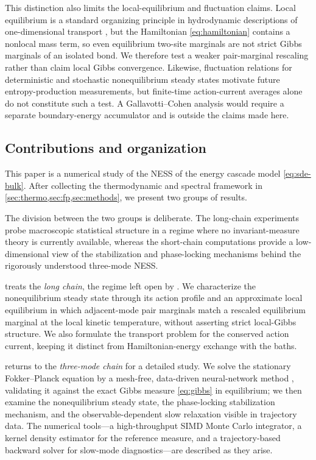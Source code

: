 \documentclass[11pt,a4paper]{article}
\theoremstyle{definition}
\numberwithin{equation}{section}   %
\begin{document}
This distinction also limits the local-equilibrium and fluctuation claims.
Local equilibrium is a standard organizing principle in hydrodynamic
descriptions of one-dimensional transport \cite{Spohn2014}, but the Hamiltonian
\eqref{eq:hamiltonian} contains a nonlocal mass term, so even equilibrium
two-site marginals are not strict Gibbs marginals of an isolated bond. We
therefore test a weaker pair-marginal rescaling rather than claim local Gibbs
convergence. Likewise, fluctuation relations for deterministic and stochastic
nonequilibrium steady states \cite{GallavottiCohen,LebowitzSpohn1999} motivate
future entropy-production measurements, but finite-time action-current averages
alone do not constitute such a test. A Gallavotti--Cohen analysis would require
a separate boundary-energy accumulator and is outside the claims made here.

\subsection{Contributions and organization}\label{sec:contributions}

This paper is a numerical study of the NESS of the energy cascade model
\eqref{eq:sde-bulk}. After collecting the thermodynamic and spectral framework in
\cref{sec:thermo,sec:fp,sec:methods}, we present two groups of results.

The division between the two groups is deliberate. The long-chain experiments
probe macroscopic statistical structure in a regime where no invariant-measure
theory is currently available, whereas the short-chain computations provide a
low-dimensional view of the stabilization and phase-locking mechanisms behind
the rigorously understood three-mode NESS.

 treats the \emph{long chain}, the regime left open by
\cite{HLNS}. We characterize the nonequilibrium steady state through its action
profile and an approximate local equilibrium in which adjacent-mode pair
marginals match a rescaled equilibrium marginal at the local kinetic
temperature, without asserting strict local-Gibbs structure. We also formulate
the transport problem for the conserved action current, keeping it distinct
from Hamiltonian-energy exchange with the baths.

 returns to the \emph{three-mode chain} for a detailed
study. We solve the stationary Fokker--Planck equation by a mesh-free,
data-driven neural-network method \cite{ZhaiDobsonLi}, validating it against the
exact Gibbs measure \eqref{eq:gibbs} in equilibrium; we then examine the
nonequilibrium steady state, the phase-locking stabilization mechanism, and the
observable-dependent slow relaxation visible in trajectory data. The numerical
tools---a high-throughput SIMD Monte Carlo integrator, a kernel density estimator
for the reference measure, and a trajectory-based backward solver for slow-mode
diagnostics---are described as they arise.
\end{document}
